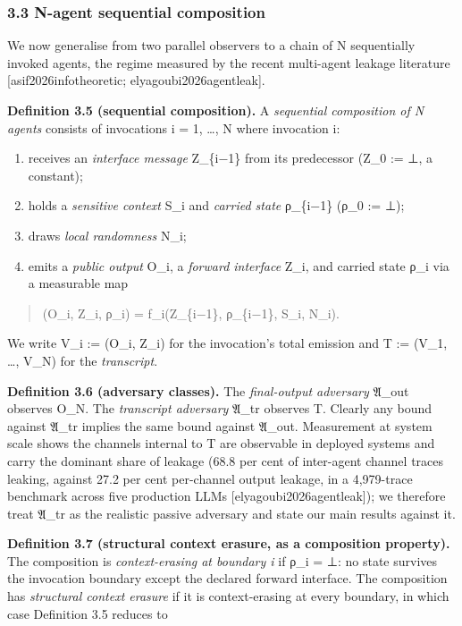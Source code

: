 \documentclass[
  11pt,
]{article}
\providecommand{\tightlist}{%
  \setlength{\itemsep}{0pt}\setlength{\parskip}{0pt}}
\begin{document}
\subsubsection{3.3 N-agent sequential
composition}\label{n-agent-sequential-composition}

We now generalise from two parallel observers to a chain of N
sequentially invoked agents, the regime measured by the recent
multi-agent leakage literature {[}asif2026infotheoretic;
elyagoubi2026agentleak{]}.

\textbf{Definition 3.5 (sequential composition).} A \emph{sequential
composition of N agents} consists of invocations i = 1, \ldots, N where
invocation i:

\begin{enumerate}
\def\labelenumi{\arabic{enumi}.}
\tightlist
\item
  receives an \emph{interface message} Z\_\{i−1\} from its predecessor
  (Z\_0 := ⊥, a constant);
\item
  holds a \emph{sensitive context} S\_i and \emph{carried state}
  ρ\_\{i−1\} (ρ\_0 := ⊥);
\item
  draws \emph{local randomness} N\_i;
\item
  emits a \emph{public output} O\_i, a \emph{forward interface} Z\_i,
  and carried state ρ\_i via a measurable map
\end{enumerate}

\begin{quote}
(O\_i, Z\_i, ρ\_i) = f\_i(Z\_\{i−1\}, ρ\_\{i−1\}, S\_i, N\_i).
\end{quote}

We write V\_i := (O\_i, Z\_i) for the invocation's total emission and T
:= (V\_1, \ldots, V\_N) for the \emph{transcript}.

\textbf{Definition 3.6 (adversary classes).} The \emph{final-output
adversary} 𝔄\_out observes O\_N. The \emph{transcript adversary} 𝔄\_tr
observes T. Clearly any bound against 𝔄\_tr implies the same bound
against 𝔄\_out. Measurement at system scale shows the channels internal
to T are observable in deployed systems and carry the dominant share of
leakage (68.8 per cent of inter-agent channel traces leaking, against
27.2 per cent per-channel output leakage, in a 4,979-trace benchmark
across five production LLMs {[}elyagoubi2026agentleak{]}); we therefore
treat 𝔄\_tr as the realistic passive adversary and state our main
results against it.

\textbf{Definition 3.7 (structural context erasure, as a composition
property).} The composition is \emph{context-erasing at boundary i} if
ρ\_i = ⊥: no state survives the invocation boundary except the declared
forward interface. The composition has \emph{structural context erasure}
if it is context-erasing at every boundary, in which case Definition 3.5
reduces to
\end{document}

